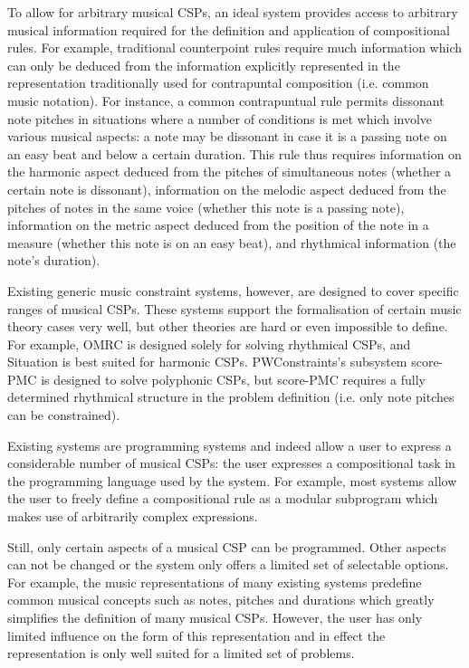 \documentclass{scrartcl}
\begin{document}
To allow for arbitrary musical CSPs, an ideal system provides access to arbitrary musical information required for the definition and application of compositional rules. 
For example, traditional counterpoint rules require much information which can only be deduced from the information explicitly represented in the representation traditionally used for contrapuntal composition (i.e. common music notation). 
For instance, a common contrapuntual rule permits dissonant note pitches in situations where a number of conditions is met which involve various musical aspects: a note may be dissonant in case it is a passing note on an easy beat and below a certain duration. This rule thus requires information on the harmonic aspect deduced from the pitches of simultaneous notes (whether a certain note is dissonant), information on the melodic aspect deduced from the pitches of notes in the same voice (whether this note is a passing note), information on the metric aspect deduced from the position of the note in a measure (whether this note is on an easy beat), and rhythmical information (the note's duration).

Existing generic music constraint systems, however, are designed to cover specific ranges of musical CSPs. These systems support the formalisation of certain music theory cases very well, but other theories are hard or even impossible to define. 
For example, OMRC is designed solely for solving rhythmical CSPs, and Situation is best suited for harmonic CSPs. PWConstraints's subsystem score-PMC is designed to solve polyphonic CSPs, but score-PMC requires a fully determined rhythmical structure in the problem definition (i.e. only note pitches can be constrained).

Existing systems are programming systems and indeed allow a user to express a considerable number of musical CSPs: the user expresses a compositional task in the programming language used by the system. For example, most systems allow the user to freely define a compositional rule as a modular subprogram which makes use of arbitrarily complex expressions. 

Still, only certain aspects of a musical CSP can be programmed. Other aspects can not be changed or the system only offers a limited set of selectable options. 
For example, the music representations of many existing systems predefine common musical concepts such as notes, pitches and durations which greatly simplifies the definition of many musical CSPs. However, the user has only limited influence on the form of this representation and in effect the representation is only well suited for a limited set of problems.
\end{document}
